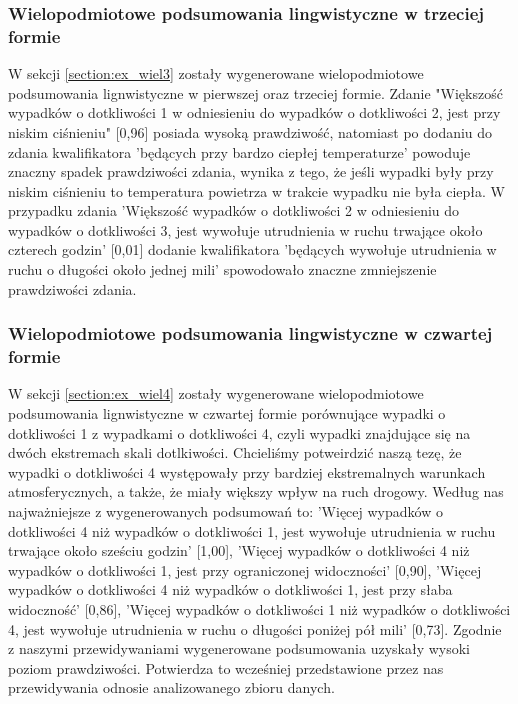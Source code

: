 \documentclass{classrep}
\begin{document}
\subsubsection{Wielopodmiotowe podsumowania lingwistyczne w trzeciej formie}

W sekcji \ref{section:ex_wiel3} zostały wygenerowane wielopodmiotowe podsumowania lignwistyczne w pierwszej oraz trzeciej formie. Zdanie "Większość wypadków o dotkliwości 1 w odniesieniu do wypadków o dotkliwości 2, jest przy niskim ciśnieniu" [0,96] posiada wysoką prawdziwość, natomiast po dodaniu do zdania kwalifikatora 'będących przy bardzo ciepłej temperaturze' powoduje znaczny spadek prawdziwości zdania, wynika z tego, że jeśli wypadki były przy niskim ciśnieniu to temperatura powietrza w trakcie wypadku nie była ciepła. W przypadku zdania 'Większość wypadków o dotkliwości 2 w odniesieniu do wypadków o dotkliwości 3, jest wywołuje utrudnienia w ruchu trwające około czterech godzin' [0,01] dodanie kwalifikatora 'będących wywołuje utrudnienia w ruchu o długości około jednej mili' spowodowało znaczne zmniejszenie prawdziwości zdania. \\

\subsubsection{Wielopodmiotowe podsumowania lingwistyczne w czwartej formie}

W sekcji \ref{section:ex_wiel4} zostały wygenerowane wielopodmiotowe podsumowania lignwistyczne w czwartej formie porównujące wypadki o dotkliwości 1 z wypadkami o dotkliwości 4, czyli wypadki znajdujące się na dwóch ekstremach skali dotlkiwości. Chcieliśmy potweirdzić naszą tezę, że wypadki o dotkliwości 4 występowały przy bardziej ekstremalnych warunkach atmosferycznych, a także, że miały większy wpływ na ruch drogowy. Według nas najważniejsze z wygenerowanych podsumowań to: 'Więcej wypadków o dotkliwości 4 niż wypadków o dotkliwości 1, jest wywołuje utrudnienia w ruchu trwające około sześciu godzin' [1,00], 'Więcej wypadków o dotkliwości 4 niż wypadków o dotkliwości 1, jest przy ograniczonej widoczności' [0,90], 'Więcej wypadków o dotkliwości 4 niż wypadków o dotkliwości 1, jest przy słaba widoczność' [0,86], 'Więcej wypadków o dotkliwości 1 niż wypadków o dotkliwości 4, jest wywołuje utrudnienia w ruchu o długości poniżej pół mili' [0,73]. Zgodnie z naszymi przewidywaniami wygenerowane podsumowania uzyskały wysoki poziom prawdziwości. Potwierdza to wcześniej przedstawione przez nas przewidywania odnosie analizowanego zbioru danych.  
\end{document}
